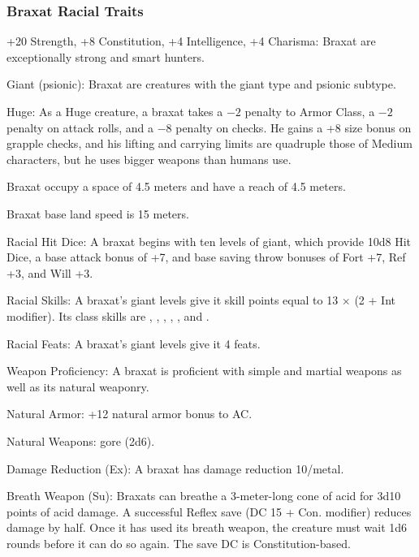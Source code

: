 \subsubsection{Braxat Racial Traits}
\begin{itemize*}
	\item +20 Strength, +8 Constitution, +4 Intelligence, +4 Charisma: Braxat are exceptionally strong and smart hunters.
    \item Giant (psionic): Braxat are creatures with the giant type and psionic subtype.
	\item Huge: As a Huge creature, a braxat takes a $-2$ penalty to Armor Class, a $-2$ penalty on attack rolls, and a $-8$ penalty on  checks. He gains a +8 size bonus on grapple checks, and his lifting and carrying limits are quadruple those of Medium characters, but he uses bigger weapons than humans use.
    \item Braxat occupy a space of 4.5 meters and have a reach of 4.5 meters.
    \item Braxat base land speed is 15 meters.

    \item Racial Hit Dice: A braxat begins with ten levels of giant, which provide 10d8 Hit Dice, a base attack bonus of +7, and base saving throw bonuses of Fort +7, Ref +3, and Will +3.
    \item Racial Skills: A braxat's giant levels give it skill points equal to 13 $\times$ (2 + Int modifier). Its class skills are , , , , , and .
    \item Racial Feats: A braxat's giant levels give it 4 feats.
    \item Weapon Proficiency: A braxat is proficient with simple and martial weapons as well as its natural weaponry.

    \item Natural Armor: +12 natural armor bonus to AC.
    \item Natural Weapons: gore (2d6).

    \item Damage Reduction (Ex): A braxat has damage reduction 10/metal.
    \item Breath Weapon (Su): Braxats can breathe a 3-meter-long cone of acid for 3d10 points of acid damage. A successful Reflex save (DC 15 + Con. modifier) reduces damage by half. Once it has used its breath weapon, the creature must wait 1d6 rounds before it can do so again. The save DC is Constitution-based.


\end{itemize*}
